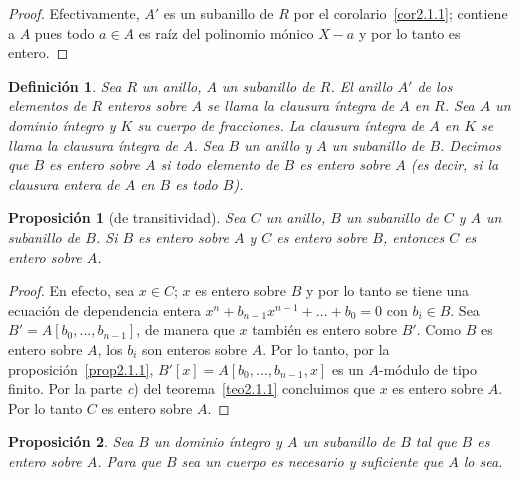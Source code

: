 \documentclass[oneside,bibtotoc,leqno,spanish]{amsbook}
\numberwithin{equation}{section}
\theoremstyle{defi}
\newtheorem{definition}{Definici\'on}
\theoremstyle{note}
\newtheorem{proposition}{Proposici\'on}
\theoremstyle{rem}
\numberwithin{theorem}{section}
\numberwithin{proposition}{section}
\numberwithin{definition}{section}
\numberwithin{lemma}{section}
\numberwithin{corollary}{section}
\numberwithin{example}{section}
\numberwithin{footnote}{section}%
\begin{document}
\begin{proof}
Efectivamente, $A'$ es un subanillo de $R$ por el corolario~\ref{cor2.1.1}; contiene a $A$ pues todo $a\in A$ es
ra\'iz del polinomio m\'onico $X-a$ y por lo tanto es entero.
\end{proof}

\begin{definition}
Sea $R$ un anillo, $A$ un subanillo de $R$. El anillo $A'$ de los elementos de $R$ enteros sobre $A$ se
llama la \emph{clausura \'integra} de $A$ en $R$. Sea $A$ un dominio \'integro y $K$ su cuerpo de fracciones. La clausura
\'integra de $A$ en $K$ se llama la clausura \'integra de $A$.
Sea $B$ un anillo y $A$ un subanillo de $B$. Decimos
que $B$ es \emph{entero} sobre $A$ si todo elemento de $B$ es entero sobre $A$ (es decir, si la clausura
entera de $A$ en $B$ es todo $B$).
\end{definition}

\begin{proposition}[de transitividad]\label{prop2.1.2}
Sea $C$ un anillo, $B$ un subanillo de $C$ y $A$ un subanillo de $B$. Si $B$ es entero sobre $A$ y $C$ es
entero sobre $B$, entonces $C$ es entero sobre $A$.
\end{proposition}

\begin{proof}
En efecto, sea $x\in C$; $x$ es entero sobre $B$ y por lo tanto se tiene una ecuaci\'on de dependencia entera
$x^{n}+b_{n-1}x^{n-1}+\dots+b_{0} = 0$ con $b_{i}\in B$. Sea $B' = A[b_{0},\dots,b_{n-1}]$, de manera que $x$
tambi\'en es entero sobre $B'$. Como $B$ es entero sobre $A$, los $b_{i}$ son enteros sobre
$A$. Por lo tanto, por la proposici\'on~\ref{prop2.1.1},
$B'[x] = A[b_{0},\dots,b_{n-1},x]$ es un $A$-m\'odulo de tipo finito. Por la parte
{\itshape c}) del teorema~\ref{teo2.1.1}
concluimos que $x$ es entero sobre $A$. Por lo tanto $C$ es entero sobre $A$.
\end{proof}

\begin{proposition}\label{prop2.1.3}
Sea $B$ un dominio \'integro y $A$ un subanillo de $B$ tal que $B$ es entero sobre $A$. Para que $B$ sea
un cuerpo es necesario y suficiente que $A$ lo sea.
\end{proposition}
\end{document}
